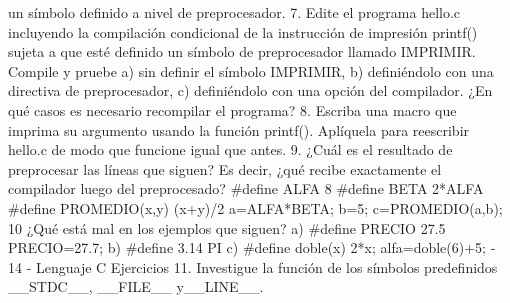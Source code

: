 un símbolo definido a nivel de preprocesador.
7. Edite el programa hello.c incluyendo la compilación condicional de la instrucción de impresión
printf() sujeta a que esté definido un símbolo de preprocesador llamado IMPRIMIR. Compile y pruebe
a) sin definir el símbolo IMPRIMIR, b) definiéndolo con una directiva de preprocesador, c)
definiéndolo con una opción del compilador. ¿En qué casos es necesario recompilar el programa?
8. Escriba una macro que imprima su argumento usando la función printf(). Aplíquela para reescribir
hello.c de modo que funcione igual que antes.
9. ¿Cuál es el resultado de preprocesar las líneas que siguen? Es decir, ¿qué recibe exactamente el
compilador luego del preprocesado?
#define ALFA 8
#define BETA 2*ALFA
#define PROMEDIO(x,y) (x+y)/2
a=ALFA*BETA;
b=5;
c=PROMEDIO(a,b);
10 ¿Qué está mal en los ejemplos que siguen?
a)
#define PRECIO 27.5
PRECIO=27.7;
b)
#define 3.14 PI
c)
#define doble(x) 2*x;
alfa=doble(6)+5;
- 14 -
Lenguaje C
Ejercicios
11. Investigue la función de los símbolos predefinidos __STDC__, __FILE__ y__LINE__.
